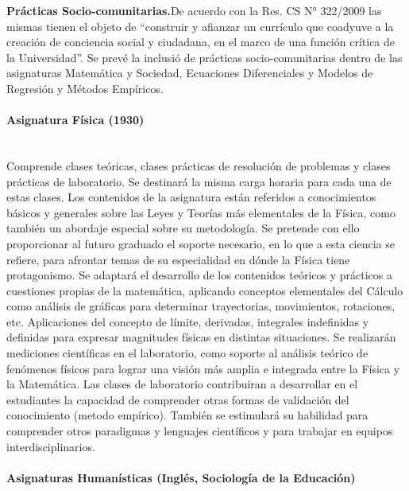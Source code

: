 \documentclass[a4paper, 12pt]{article}
\begin{document}
\begin{description}
\item{\textbf{Prácticas Socio-comunitarias.}}De acuerdo
con la Res. CS N° 322/2009 las mismas tienen el objeto de ``construir y afianzar un currículo que coadyuve a la creación de conciencia social y
ciudadana, en el marco de una función crítica de la Universidad''. Se prevé la inclusió de  prácticas socio-comunitarias  dentro de las
asignaturas Matemática y Sociedad, Ecuaciones Diferenciales y Modelos de Regresión y Métodos Empíricos.
\end{description}


\paragraph{Asignatura Física (1930)}\mbox{}\\

Comprende clases teóricas, clases prácticas  de resolución de problemas y clases prácticas de laboratorio. Se destinará la misma carga horaria  para cada una de estas clases. Los contenidos de la asignatura están referidos a conocimientos básicos y generales sobre las Leyes y Teorías más elementales de la Física, como también un abordaje especial sobre su metodología. Se pretende con ello proporcionar al futuro graduado el soporte necesario, en lo que a esta ciencia se refiere, para afrontar temas de su especialidad en dónde la Física tiene protagonismo. Se adaptará el desarrollo de los contenidos teóricos y prácticos a cuestiones propias de la matemática, aplicando conceptos elementales del Cálculo como análisis de gráficas para determinar trayectorias, movimientos, rotaciones, etc. Aplicaciones del concepto de límite, derivadas, integrales indefinidas y definidas para expresar magnitudes físicas en distintas situaciones. Se realizarán  mediciones científicas en el laboratorio, como soporte al análisis teórico de fenómenos físicos para lograr una visión más amplia e integrada entre la Física y la Matemática.   Las clases de laboratorio contribuiran a desarrollar en el estudiantes la capacidad de  comprender otras formas de validación del conocimiento (metodo empírico). También se estimulará su habilidad para comprender otros paradigmas y lenguajes científicos y para trabajar en equipos interdisciplinarios.
 


\paragraph{Asignaturas Humanísticas (Inglés, Sociología de la Educación)}\mbox{}\\
\end{document}
